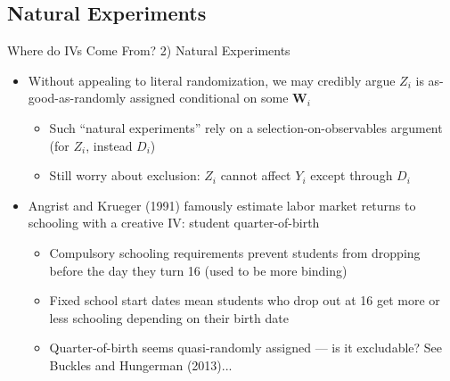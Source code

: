 \documentclass{beamer}
\begin{document}
\subsection{Natural Experiments}
\begin{frame}{Where do IVs Come From? 2) Natural Experiments}
\begin{itemize}
\item Without appealing to literal randomization, we may credibly argue $Z_i$ is as-good-as-randomly assigned conditional on some $\mathbf{W}_i$\smallskip
\begin{itemize}
\item Such ``natural experiments'' rely on a selection-on-observables argument (for $Z_i$, instead $D_i$)
\smallskip
\item Still worry about exclusion: $Z_i$ cannot affect $Y_i$ except through $D_i$
\end{itemize}\pause{}\medskip
\item Angrist and Krueger (1991) famously estimate labor market returns to schooling with a creative IV: student quarter-of-birth\smallskip
\begin{itemize}
\item Compulsory schooling requirements prevent students from dropping before the day they turn 16 (used to be more binding)
\smallskip
\item Fixed school start dates mean students who drop out at 16 get more or less schooling depending on their birth date\pause{}
\smallskip
\item Quarter-of-birth seems quasi-randomly assigned --- is it excludable? See Buckles and Hungerman (2013)...
\end{itemize}
\end{itemize}
\end{frame}
\end{document}
